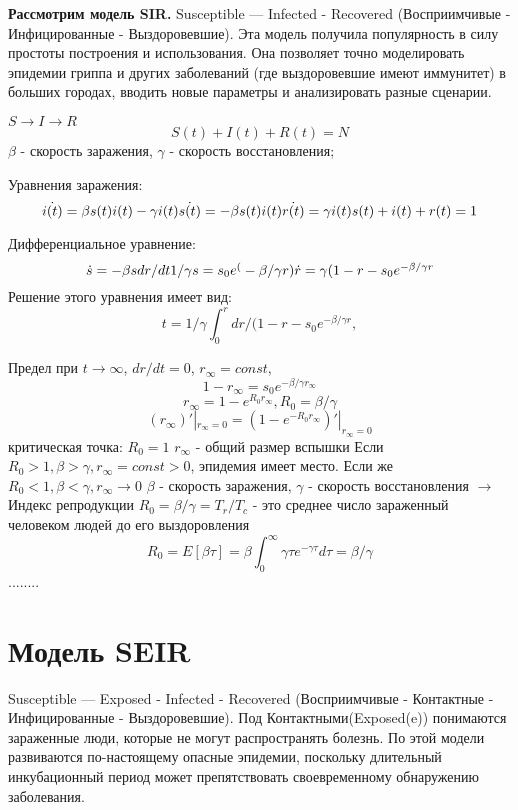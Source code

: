 \textbf{Рассмотрим модель SIR.}
Susceptible — Infected - Recovered (Восприимчивые - Инфицированные - Выздоровевшие).
Эта модель получила популярность в силу простоты построения и использования. Она позволяет точно моделировать эпидемии гриппа и других заболеваний (где выздоровевшие имеют иммунитет) в больших городах, вводить новые параметры и анализировать разные сценарии.

$S \rightarrow I \rightarrow R$
\begin{equation}
    S(t) + I(t) +R(t)=N
    \end{equation}
$\beta$ - скорость заражения,
$\gamma$ - скорость восстановления;

Уравнения заражения:
\begin{equation}
    \dot{i(t)}=\beta s(t)i(t) -\gamma i(t)
    $$ $$
    \dot{s(t)}= - \beta s(t)i(t)
    $$ $$
    \dot{r(t)} = \gamma i(t)
    $$ $$
    s(t) +i(t) + r(t) = 1
    \end{equation}

Дифференциальное уравнение:
\begin{equation}
    \dot{s}=-\beta s dr/dt 1/\gamma
    $$ $$
    s = s_0 e^(-\beta/\gamma r)
    \dot{r} = \gamma(1-r-s_0 e^{-\beta/\gamma r}
 \end{equation}
Решение этого уравнения имеет вид:
$$ t = 1/\gamma \int_0^r dr/(1-r-s_0 e^{-\beta / \gamma r},$$

Предел при $ t \rightarrow \infty $, $ dr/dt = 0$, $r_\infty = const$,
$$ 1 -r_\infty = s_0 e^{-\beta/\gamma r_\infty}$$
$$ r_\infty = 1- e^{R_0 r_\infty}, R_0 = \beta/\gamma$$
$$(r_\infty)'|_{r_\infty=0} = (1 - e^{-R_0 r_\infty})'|_{r_\infty =0}$$
критическая точка: $R_0 = 1$
$r_\infty$ - общий размер вспышки
Если $R_0 > 1, \beta > \gamma , r_\infty = const>0$, эпидемия имеет место.
Если же $ R_0 < 1, \beta < \gamma , r_\infty \rightarrow 0$
$\beta$ - скорость заражения, $\gamma$ - скорость восстановления $\rightarrow$
Индекс репродукции $R_0 = \beta/\gamma = T_r/T_c$ - это среднее число зараженный человеком людей до его выздоровления
$$R_0 = E[\beta\tau] = \beta \int_0^\infty \gamma\tau e^{-\gamma\tau} d\tau =\beta/\gamma$$
........


\section{Модель SEIR}\label{1sec:SEIR}
Susceptible — Exposed - Infected - Recovered (Восприимчивые - Контактные - Инфицированные - Выздоровевшие).
Под Контактными(Exposed(e)) понимаются зараженные люди, которые не могут распространять болезнь.
По этой модели развиваются по-настоящему опасные эпидемии, поскольку длительный инкубационный период может препятствовать своевременному обнаружению заболевания.

